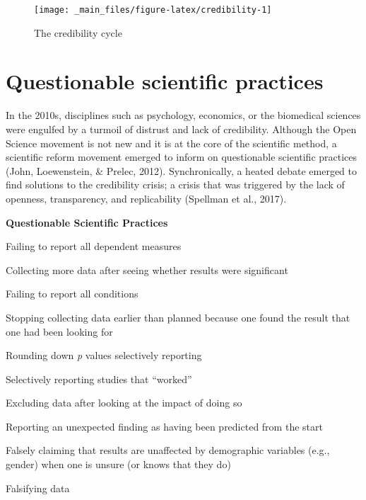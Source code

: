 \documentclass[
]{book}
\theoremstyle{definition}
\theoremstyle{definition}
\theoremstyle{definition}
\theoremstyle{definition}
\theoremstyle{remark}
\begin{document}
\begin{figure}

{\centering \texttt{[image: \_main\_files/figure-latex/credibility-1]} 

}

\caption{The credibility cycle}\label{fig:credibility}
\end{figure}

\hypertarget{questionable-scientific-practices}{%
\section{Questionable scientific practices}\label{questionable-scientific-practices}}

In the 2010s, disciplines such as psychology, economics, or the biomedical sciences were engulfed by a turmoil of distrust and lack of credibility. Although the Open Science movement is not new and it is at the core of the scientific method, a scientific reform movement emerged to inform on questionable scientific practices (John, Loewenstein, \& Prelec, 2012). Synchronically, a heated debate emerged to find solutions to the credibility crisis; a crisis that was triggered by the lack of openness, transparency, and replicability (Spellman et al., 2017).

\textbf{Questionable Scientific Practices}

Failing to report all dependent measures

Collecting more data after seeing whether results were significant

Failing to report all conditions

Stopping collecting data earlier than planned because one found the result that one had been looking for

Rounding down \emph{p} values selectively reporting

Selectively reporting studies that ``worked''

Excluding data after looking at the impact of doing so

Reporting an unexpected finding as having been predicted from the start

Falsely claiming that results are unaffected by demographic variables (e.g., gender) when one is unsure (or knows that they do)

Falsifying data
\end{document}
